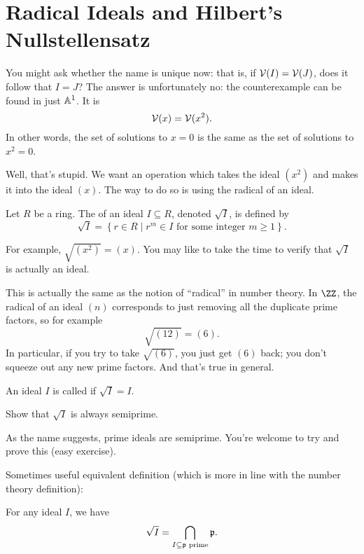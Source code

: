 \section{Radical Ideals and Hilbert's Nullstellensatz}
You might ask whether the name is unique now:
that is, if $\mathcal V(I) = \mathcal V(J)$, does it follow that $I=J$?
The answer is unfortunately no: the counterexample can be found in just $\mathbb A^1$.
It is
\[ \mathcal V(x) = \mathcal V(x^2). \]
In other words, the set of solutions to $x=0$ is the same as the set of solutions to $x^2=0$.

Well, that's stupid.
We want an operation which takes the ideal $(x^2)$ and makes it into the ideal $(x)$.
The way to do so is using the radical of an ideal.

\begin{definition}
	Let $R$ be a ring.
	The  of an ideal $I \subseteq R$, denoted $\sqrt I$,
	is defined by
	\[
		\sqrt I =
		\left\{ r \in R
			\mid r^m \in I \text{ for some integer $m \ge 1$}  \right\}. 
	\]
\end{definition}
For example, $\sqrt{(x^2)} = (x)$.
You may like to take the time to verify that $\sqrt I$ is actually an ideal.

This is actually the same as the notion of ``radical'' in number theory.
In $\ZZ$, the radical of an ideal $(n)$ corresponds to just
removing all the duplicate prime factors, so for example
\[ \sqrt{(12)} = (6). \]
In particular, if you try to take $\sqrt{(6)}$, you just get $(6)$ back;
you don't squeeze out any new prime factors.
And that's true in general.

\begin{definition}
	An ideal $I$ is called  if $\sqrt I = I$.
\end{definition}
\begin{ques}
	Show that $\sqrt I$ is always semiprime.
\end{ques}
\begin{remark}
	As the name suggests, prime ideals are semiprime.
	You're welcome to try and prove this (easy exercise).
\end{remark}
Sometimes useful equivalent definition
(which is more in line with the number theory definition):
\begin{theorem}
	For any ideal $I$, we have
	\[ \sqrt I = \bigcap_{I \subseteq \mathfrak p \text{ prime}} \mathfrak p. \]
\end{theorem}

